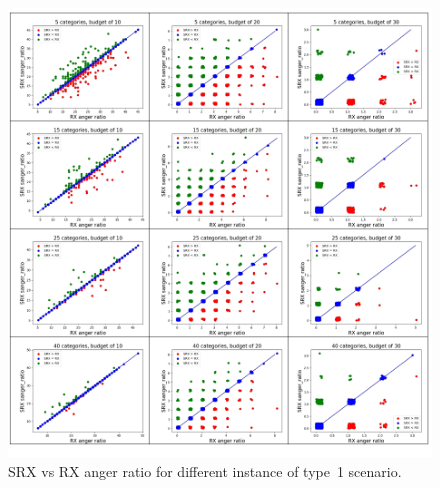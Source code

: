 \documentclass[runningheads]{llncs}
\begin{document}
\begin{subappendices}
\begin{figure}[t]
\begin{center}
\includegraphics[width=14cm]{simulation/unit_scatters_ar.png}
\caption{SRX vs RX anger ratio for different instance of type~1 scenario.
}\label{fig:scatter_all_ar1}
\end{center}
\end{figure}


\end{subappendices}
\end{document}
